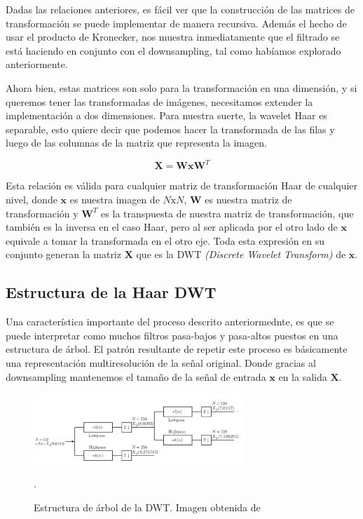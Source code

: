 \documentclass[conference]{IEEEtran}
\begin{document}
Dadas las relaciones anteriores, es fácil ver que la construcción de las matrices de transformación se puede implementar de manera recursiva. Además el hecho de usar el producto de Kronecker, nos muestra inmediatamente que el filtrado se está haciendo en conjunto con el downsampling, tal como habíamos explorado anteriormente.

Ahora bien, estas matrices son solo para la transformación en una dimensión, y si queremos tener las transformadas de imágenes, necesitamos extender la implementación a dos dimensiones. Para nuestra suerte, la wavelet Haar es separable, esto quiere decir que podemos hacer la transformada de las filas y luego de las columnas de la matriz que representa la imagen.


\begin{equation}
  \pmb{X} = \pmb{W}\pmb{x}\pmb{W}^T
\end{equation}

Esta relación es válida para cualquier matriz de transformación Haar de cualquier nivel, donde $\pmb{x}$ es nuestra imagen de $N\text{x}N$, $\pmb{W}$ es nuestra matriz de transformación y $\pmb{W}^T$ es la transpuesta de nuestra matriz de transformación, que también es la inversa en el caso Haar, pero al ser aplicada por el otro lado de $\pmb{x}$ equivale a tomar la transformada en el otro eje. Toda esta expresión en su conjunto generan la matriz $\pmb{X}$ que es la DWT \emph{(Discrete Wavelet Transform)} de $\pmb{x}$.





\subsection{Estructura de la Haar DWT} \label{estruct}


Una característica importante del proceso descrito anteriormednte, es que se puede interpretar como muchos filtros pasa-bajos y pasa-altos puestos en una estructura de árbol. El patrón resultante de repetir este proceso es básicamente una representación multiresolución de la señal original. Donde gracias al downsampling mantenemos el tamaño de la señal de entrada $\pmb{x}$ en la salida $\pmb{X}$.


\begin{figure}[H]
\includegraphics[width=8cm]{images/tree.png}
\caption{Estructura de árbol de la DWT. Imagen obtenida de \cite{dwt}}.
\end{figure}
\end{document}
